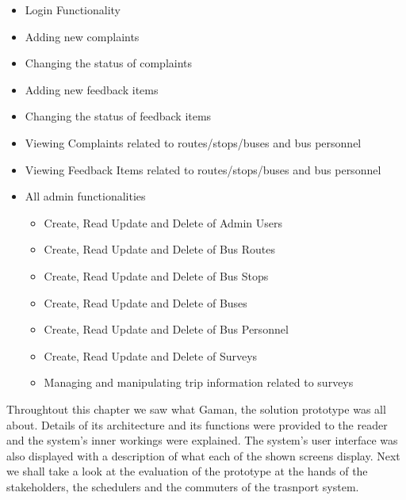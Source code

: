 \begin{itemize}
\item Login Functionality
\item Adding new complaints
\item Changing the status of complaints
\item Adding new feedback items
\item Changing the status of feedback items
\item Viewing Complaints related to routes/stops/buses and bus personnel
\item Viewing Feedback Items related to routes/stops/buses and bus personnel
\item All admin functionalities
	\begin{itemize}
		\item Create, Read Update and Delete of Admin Users
		\item Create, Read Update and Delete of Bus Routes
		\item Create, Read Update and Delete of Bus Stops
		\item Create, Read Update and Delete of Buses
		\item Create, Read Update and Delete of Bus Personnel
		\item Create, Read Update and Delete of Surveys
		\item Managing and manipulating trip information related to surveys
	\end{itemize}
\end{itemize}

Throughtout this chapter we saw what Gaman, the solution prototype was all about. Details of its architecture and its functions were provided to the reader and the system's inner workings were explained. The system's user interface was also displayed with a description of what each of the shown screens display. Next we shall take a look at the evaluation of the prototype at the hands of the stakeholders, the schedulers and the commuters of the trasnport system.


